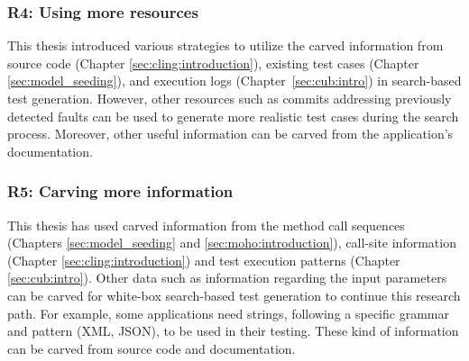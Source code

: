 \subsubsection{R4: Using more resources}
This thesis introduced various strategies to utilize the carved information from source code (\eg Chapter \ref{sec:cling:introduction}), existing test cases (\eg Chapter \ref{sec:model_seeding}), and execution logs (Chapter~\ref{sec:cub:intro}) in search-based test generation. However, other resources such as commits addressing previously detected faults can be used to generate more realistic test cases during the search process. Moreover, other useful information can be carved from the application's documentation.

\subsubsection{R5: Carving more information}
This thesis has used carved information from the method call sequences (\eg Chapters \ref{sec:model_seeding} and \ref{sec:moho:introduction}), call-site information (Chapter \ref{sec:cling:introduction}) and test execution patterns (Chapter \ref{sec:cub:intro}). Other data such as information regarding the input parameters can be carved for white-box search-based test generation to continue this research path. For example, some applications need strings, following a specific grammar and pattern (\eg XML, JSON), to be used in their testing. These kind of information can be carved from source code and documentation.